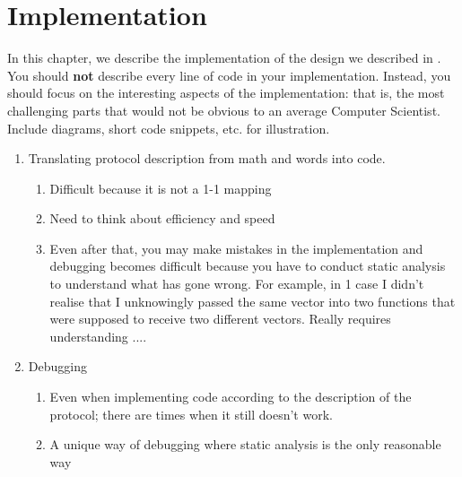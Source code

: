 \section{Implementation}
\label{ch:implementation}

In this chapter, we describe the implementation of the design we described in . You should \textbf{not} describe every line of code in your implementation. Instead, you should focus on the interesting aspects of the implementation: that is, the most challenging parts that would not be obvious to an average Computer Scientist. Include diagrams, short code snippets, etc. for illustration. 

\begin{enumerate}
    \item Translating protocol description from math and words into code.
    \begin{enumerate}
        \item Difficult because it is not a 1-1 mapping
        \item Need to think about efficiency and speed
        \item Even after that, you may make mistakes in the implementation and debugging becomes difficult because you have to conduct static analysis to understand what has gone wrong. For example, in 1 case I didn't realise that I unknowingly passed the same vector into two functions that were supposed to receive two different vectors. Really requires understanding ....
    \end{enumerate}
    \item Debugging 
    \begin{enumerate}
        \item Even when implementing code according to the description of the protocol; there are times when it still doesn't work.
        \item A unique way of debugging where static analysis is the only reasonable way
    \end{enumerate}
\end{enumerate}